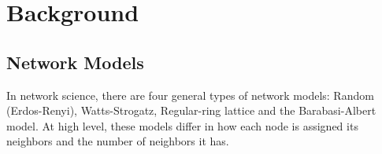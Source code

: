 \documentclass[runningheads]{llncs}
\begin{document}
% 
\section{Background}
\subsection{Network Models}
In network science, there are four general types of network models: Random (Erdos-Renyi), Watts-Strogatz, Regular-ring lattice and the Barabasi-Albert model. At high level, these models differ in how each node is assigned its neighbors and the number of neighbors it has. 
\end{document}
